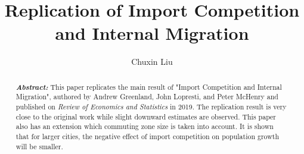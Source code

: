 \documentclass[12pt, final]{CSP}
\begin{document}
\begin{frontmatter}

\title{Replication of Import Competition and Internal Migration}

\author[mymainaddress]{Chuxin Liu}

\address[mymainaddress]{CUNY Graduate Center}

\begin{abstract}\rm
\begin{adjustwidth}{2cm}{2cm}{\itshape\textbf{Abstract:}} 
This paper replicates the main result of "Import Competition and Internal Migration"\cite{greenland2019import}, authored by Andrew Greenland, John Lopresti, and Peter McHenry and published on \textit{Review of Economics and Statistics} in 2019. The replication result is very close to the original work while slight downward estimates are observed. This paper also has an extension which commuting zone size is taken into account. It is shown that for larger cities, the negative effect of import competition on population growth will be smaller. 
\newline 
\newline 
\newline 
\end{adjustwidth}
\end{abstract}
\end{frontmatter}
\end{document}

